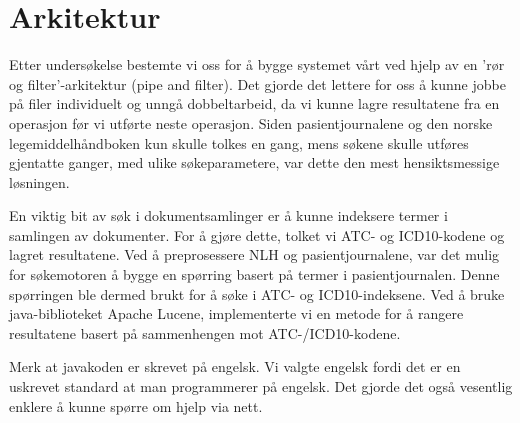 \section{Arkitektur}
\label{sec:arkitektur}

Etter undersøkelse bestemte vi oss for å bygge systemet vårt ved hjelp av en 'rør og filter'-arkitektur (pipe and filter). Det gjorde det lettere for oss å kunne jobbe på filer individuelt og unngå dobbeltarbeid, da vi kunne lagre resultatene fra en operasjon før vi utførte neste operasjon. Siden pasientjournalene og den norske legemiddelhåndboken kun skulle tolkes en gang, mens søkene skulle utføres gjentatte ganger, med ulike søkeparametere, var dette den mest hensiktsmessige løsningen.


En viktig bit av søk i dokumentsamlinger er å kunne indeksere termer i samlingen av dokumenter. For å gjøre dette, tolket vi ATC- og ICD10-kodene og lagret resultatene. Ved å preprosessere NLH og pasientjournalene, var det mulig for søkemotoren å bygge en spørring basert på termer i pasientjournalen. Denne spørringen ble dermed brukt for å søke i ATC- og ICD10-indeksene. Ved å bruke java-biblioteket Apache Lucene, implementerte vi en metode for å rangere resultatene basert på sammenhengen mot ATC-/ICD10-kodene.

Merk at javakoden er skrevet på engelsk. Vi valgte engelsk fordi det er en uskrevet standard at man programmerer på engelsk. Det gjorde det også vesentlig enklere å kunne spørre om hjelp via nett.

